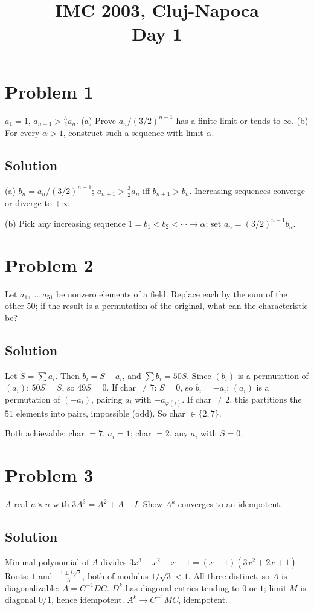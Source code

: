 \documentclass{article}
\title{IMC 2003, Cluj-Napoca \\ Day 1}
\date{}
\begin{document}
\maketitle

\section*{Problem 1}
$a_1 = 1$, $a_{n+1} > \tfrac{3}{2} a_n$. (a) Prove $a_n / (3/2)^{n-1}$ has a finite limit or tends to $\infty$. (b) For every $\alpha > 1$, construct such a sequence with limit $\alpha$.

\subsection*{Solution}
(a) $b_n = a_n / (3/2)^{n-1}$; $a_{n+1} > \tfrac{3}{2} a_n$ iff $b_{n+1} > b_n$. Increasing sequences converge or diverge to $+\infty$.

(b) Pick any increasing sequence $1 = b_1 < b_2 < \cdots \to \alpha$; set $a_n = (3/2)^{n-1} b_n$.

\section*{Problem 2}
Let $a_1, \ldots, a_{51}$ be nonzero elements of a field. Replace each by the sum of the other 50; if the result is a permutation of the original, what can the characteristic be?

\subsection*{Solution}
Let $S = \sum a_i$. Then $b_i = S - a_i$, and $\sum b_i = 50 S$. Since $(b_i)$ is a permutation of $(a_i)$: $50 S = S$, so $49 S = 0$. If char $\ne 7$: $S = 0$, so $b_i = -a_i$; $(a_i)$ is a permutation of $(-a_i)$, pairing $a_i$ with $-a_{\varphi(i)}$. If char $\ne 2$, this partitions the $51$ elements into pairs, impossible (odd). So char $\in \{2, 7\}$.

Both achievable: char $= 7$, $a_i = 1$; char $= 2$, any $a_i$ with $S = 0$.

\section*{Problem 3}
$A$ real $n \times n$ with $3 A^3 = A^2 + A + I$. Show $A^k$ converges to an idempotent.

\subsection*{Solution}
Minimal polynomial of $A$ divides $3 x^3 - x^2 - x - 1 = (x - 1)(3x^2 + 2x + 1)$. Roots: $1$ and $\tfrac{-1 \pm i \sqrt 2}{3}$, both of modulus $1/\sqrt 3 < 1$. All three distinct, so $A$ is diagonalizable: $A = C^{-1} D C$. $D^k$ has diagonal entries tending to $0$ or $1$; limit $M$ is diagonal $0/1$, hence idempotent. $A^k \to C^{-1} M C$, idempotent.
\end{document}
